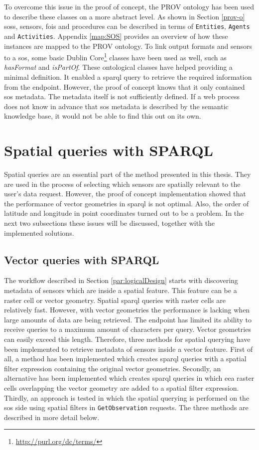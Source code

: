 To overcome this issue in the proof of concept, the PROV ontology has been used to describe these classes on a more abstract level. As shown in Section \ref{prov-o}  \aclp{sos}, sensors, \acp{foi} and procedures can be described in terms of \texttt{Entities}, \texttt{Agents} and \texttt{Activities}. Appendix \ref{map:SOS} provides an overview of how these instances are mapped to the PROV ontology. To link output formats and sensors to a \ac{sos}, some basic Dublin Core\footnote{\url{http://purl.org/dc/terms/}} classes have been used as well, such as \textit{hasFormat} and \textit{isPartOf}. These ontological classes have helped providing a minimal definition. It enabled a \ac{sparql} query to retrieve the required information from the endpoint. However, the proof of concept knows that it only contained \ac{sos} metadata. The metadata itself is not sufficiently defined. If a web process does not know in advance that \ac{sos} metadata is described by the semantic knowledge base, it would not be able to find this out on its own. 

\section{Spatial queries with SPARQL}
\label{par:spQueries}
Spatial queries are an essential part of the method presented in this thesis. They are used in the process of selecting which sensors are spatially relevant to the user's data request. However, the proof of concept implementation showed that the performance of vector geometries in \ac{sparql} is not optimal. Also, the order of latitude and longitude in point coordinates turned out to be a problem. In the next two subsections these issues will be discussed, together with the implemented solutions.     

\subsection{Vector queries with SPARQL}
The workflow described in Section \ref{par:logicalDesign} starts with discovering metadata of sensors which are inside a spatial feature. This feature can be a raster cell or vector geometry. Spatial \ac{sparql} queries with raster cells are relatively fast. However, with vector geometries the performance is lacking when large amounts of data are being retrieved. The endpoint has limited its ability to receive queries to a maximum amount of characters per query. Vector geometries can easily exceed this length. Therefore, three methods for spatial querying have been implemented to retrieve metadata of sensors inside a vector feature. First of all, a method has been implemented which creates \ac{sparql} queries with a spatial filter expression containing the original vector geometries. Secondly, an alternative has been implemented which creates \ac{sparql} queries in which \ac{eea} raster cells overlapping the vector geometry are added to a spatial filter expression. Thirdly, an approach is tested in which the spatial querying is performed on the \ac{sos} side using spatial filters in \texttt{GetObservation} requests. The three methods are described in more detail below.

